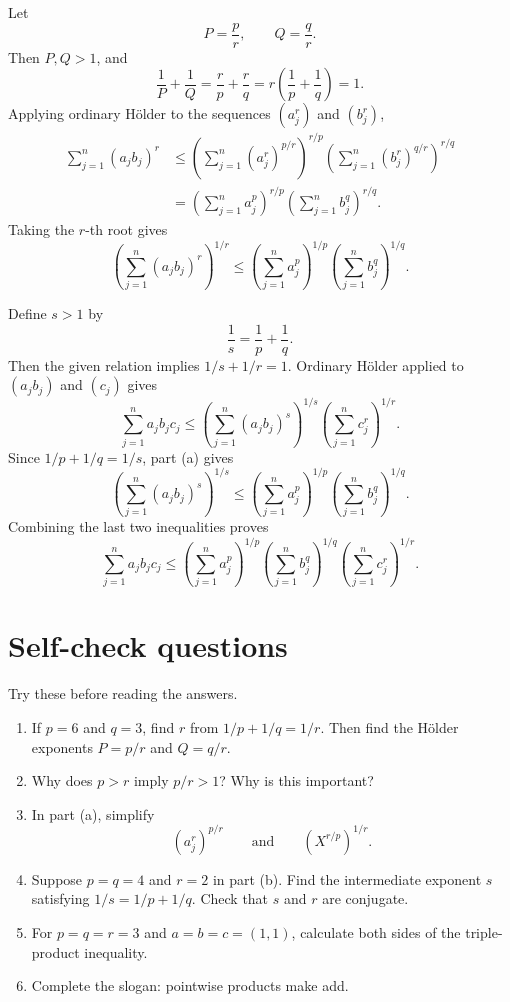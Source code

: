 \documentclass[11pt]{article}
\begin{document}
\begin{solutionBox}[Part (a)]
Let
\[
  P=\frac{p}{r},
  \qquad
  Q=\frac{q}{r}.
\]
Then \(P,Q>1\), and
\[
  \frac1P+\frac1Q
  =\frac{r}{p}+\frac{r}{q}
  =r\left(\frac1p+\frac1q\right)=1.
\]
Applying ordinary H\"older to the sequences \((a_j^r)\) and \((b_j^r)\),
\[
\begin{aligned}
 \sum_{j=1}^{n}(a_jb_j)^r
 &\leq
 \left(\sum_{j=1}^{n}(a_j^r)^{p/r}\right)^{r/p}
 \left(\sum_{j=1}^{n}(b_j^r)^{q/r}\right)^{r/q}\\
 &=
 \left(\sum_{j=1}^{n}a_j^p\right)^{r/p}
 \left(\sum_{j=1}^{n}b_j^q\right)^{r/q}.
\end{aligned}
\]
Taking the \(r\)-th root gives
\[
  \left(\sum_{j=1}^{n}(a_jb_j)^r\right)^{1/r}
  \leq
  \left(\sum_{j=1}^{n}a_j^p\right)^{1/p}
  \left(\sum_{j=1}^{n}b_j^q\right)^{1/q}.
\]
\end{solutionBox}

\begin{solutionBox}[Part (b)]
Define \(s>1\) by
\[
  \frac1s=\frac1p+\frac1q.
\]
Then the given relation implies \(1/s+1/r=1\). Ordinary H\"older applied to \((a_jb_j)\) and \((c_j)\) gives
\[
  \sum_{j=1}^{n}a_jb_jc_j
  \leq
  \left(\sum_{j=1}^{n}(a_jb_j)^s\right)^{1/s}
  \left(\sum_{j=1}^{n}c_j^r\right)^{1/r}.
\]
Since \(1/p+1/q=1/s\), part (a) gives
\[
  \left(\sum_{j=1}^{n}(a_jb_j)^s\right)^{1/s}
  \leq
  \left(\sum_{j=1}^{n}a_j^p\right)^{1/p}
  \left(\sum_{j=1}^{n}b_j^q\right)^{1/q}.
\]
Combining the last two inequalities proves
\[
  \sum_{j=1}^{n}a_jb_jc_j
  \leq
  \left(\sum_{j=1}^{n}a_j^p\right)^{1/p}
  \left(\sum_{j=1}^{n}b_j^q\right)^{1/q}
  \left(\sum_{j=1}^{n}c_j^r\right)^{1/r}.
\]
\end{solutionBox}

\section{Self-check questions}

Try these before reading the answers.

\begin{enumerate}
  \item If \(p=6\) and \(q=3\), find \(r\) from \(1/p+1/q=1/r\). Then find the H\"older exponents \(P=p/r\) and \(Q=q/r\).

  \item Why does \(p>r\) imply \(p/r>1\)? Why is this important?

  \item In part (a), simplify
  \[
    (a_j^r)^{p/r}
    \qquad\text{and}\qquad
    \left(X^{r/p}\right)^{1/r}.
  \]

  \item Suppose \(p=q=4\) and \(r=2\) in part (b). Find the intermediate exponent \(s\) satisfying \(1/s=1/p+1/q\). Check that \(s\) and \(r\) are conjugate.

  \item For \(p=q=r=3\) and \(a=b=c=(1,1)\), calculate both sides of the triple-product inequality.

  \item Complete the slogan: pointwise products make \underline{\hspace{3cm}} add.
\end{enumerate}
\end{document}
